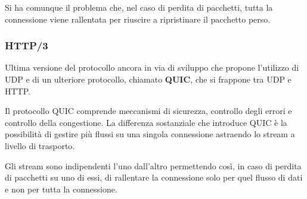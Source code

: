 Si ha comunque il problema che, nel caso di perdita di pacchetti, tutta
la connessione viene rallentata per riuscire a ripristinare il 
pacchetto perso.

\subsubsection{HTTP/3}
Ultima versione del protocollo ancora in via di sviluppo che propone 
l'utilizzo di UDP e di un ulteriore protocollo, chiamato \textbf{QUIC},
che si frappone tra UDP e HTTP.

Il protocollo QUIC comprende meccanismi di sicurezza, controllo degli 
errori e controllo della congestione. La differenza sostanziale che 
introduce QUIC è la possibilità di gestire più flussi su una singola 
connessione astraendo lo stream a livello di trasporto.

Gli stream sono indipendenti l'uno dall'altro permettendo così, in caso
di perdita di pacchetti su uno di essi, di rallentare la connessione 
solo per quel flusso di dati e non per tutta la connessione.
